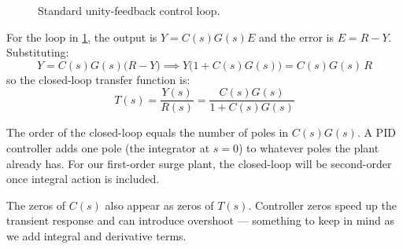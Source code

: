 \documentclass[12pt]{article}
\begin{document}
\begin{figure}[htbp]
\centering
{}
\caption{Standard unity-feedback control loop.}
\label{fig:unity_feedback}
\end{figure}

For the loop in \cref{fig:unity_feedback}, the output is $Y = C(s)G(s)E$ and
the error is $E = R - Y$.  Substituting:
\[
  Y = C(s)G(s)\bigl(R - Y\bigr)
  \implies Y\bigl(1 + C(s)G(s)\bigr) = C(s)G(s)\,R
\]
so the closed-loop transfer function is:
\begin{equation}
  T(s) = \frac{Y(s)}{R(s)} = \frac{C(s)G(s)}{1 + C(s)G(s)}
  \label{eq:cltf}
\end{equation}

The order of the closed-loop equals the number of poles in $C(s)G(s)$.  A PID
controller adds one pole (the integrator at $s=0$) to whatever poles the plant
already has.  For our first-order surge plant, the closed-loop will be
second-order once integral action is included.

The zeros of $C(s)$ also appear as zeros of $T(s)$.  Controller zeros speed up
the transient response and can introduce overshoot --- something to keep in mind
as we add integral and derivative terms.


\end{document}
